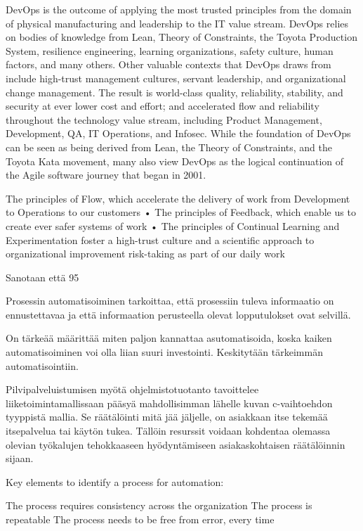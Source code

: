 \documentclass[finnish,12pt,a4paper,pdftex]{article}
\begin{document}
DevOps is the outcome of applying the most trusted principles from the
domain of physical manufacturing and leadership to the IT value stream.
DevOps relies on bodies of knowledge from Lean, Theory of Constraints,
the Toyota Production System, resilience engineering, learning organizations,
safety culture, human factors, and many others. Other valuable
contexts that DevOps draws from include high-trust management cultures,
servant leadership, and organizational change management. The result is
world-class quality, reliability, stability, and security at ever lower cost and
effort; and accelerated flow and reliability throughout the technology
value stream, including Product Management, Development, QA, IT Operations,
and Infosec.
While the foundation of DevOps can be seen as being derived from Lean, the
Theory of Constraints, and the Toyota Kata movement, many also view DevOps
as the logical continuation of the Agile software journey that began in 2001.

The principles of Flow, which accelerate the delivery of work from
Development to Operations to our customers
• The principles of Feedback, which enable us to create ever safer
systems of work
• The principles of Continual Learning and Experimentation foster
a high-trust culture and a scientific approach to organizational
improvement risk-taking as part of our daily work



Sanotaan että 95%

Prosessin automatisoiminen tarkoittaa, että prosessiin tuleva informaatio on ennustettavaa ja että informaation perusteella olevat lopputulokset ovat selvillä. 

On tärkeää määrittää miten paljon kannattaa asutomatisoida, koska kaiken automatisoiminen voi olla liian suuri investointi. Keskitytään tärkeimmän automatisointiin. 

Pilvipalveluistumisen myötä ohjelmistotuotanto tavoittelee liiketoimintamallissaan pääsyä mahdollisimman lähelle kuvan c-vaihtoehdon tyyppistä mallia. Se räätälöinti mitä jää jäljelle, on asiakkaan itse tekemää itsepalvelua tai käytön tukea. Tällöin resurssit voidaan kohdentaa olemassa olevian työkalujen tehokkaaseen hyödyntämiseen asiakaskohtaisen räätälöinnin sijaan. 


Key elements to identify a process for automation:

The process requires consistency across the organization
The process is repeatable
The process needs to be free from error, every time
\end{document}

